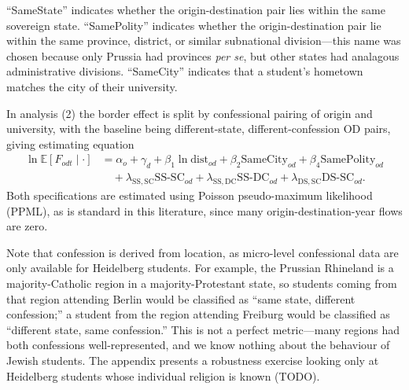 \documentclass[11pt]{article}
\begin{document}
``SameState'' indicates whether the origin-destination pair lies within the same sovereign state. ``SamePolity'' indicates whether the origin-destination pair lie within the same province, district, or similar subnational division---this name was chosen because only Prussia had provinces \emph{per se}, but other states had analagous administrative divisions. ``SameCity'' indicates that a student's hometown matches the city of their university.

In analysis (2) the border effect is split by confessional pairing of origin and university, with the baseline being different-state, different-confession OD pairs, giving estimating equation
\begin{equation}
\begin{split}
\ln \mathbb{E}\!\left[F_{odt} \mid \cdot\right]
  &= \alpha_o + \gamma_d + \beta_1 \ln \mathrm{dist}_{od}
   + \beta_2 \mathrm{SameCity}_{od}
   + \beta_4 \mathrm{SamePolity}_{od} \\
  &\quad + \lambda_{\mathrm{SS,SC}} \mathrm{SS\text{-}SC}_{od}
   + \lambda_{\mathrm{SS,DC}} \mathrm{SS\text{-}DC}_{od}
   + \lambda_{\mathrm{DS,SC}} \mathrm{DS\text{-}SC}_{od}.
\end{split}
\label{eq:gravity_confession}
\end{equation}
Both specifications are estimated using Poisson pseudo-maximum likelihood (PPML), as is standard in this literature, since many origin-destination-year flows are zero.

Note that confession is derived from location, as micro-level confessional data are only available for Heidelberg students. For example, the Prussian Rhineland is a majority-Catholic region in a majority-Protestant state, so students coming from that region attending Berlin would be classified as ``same state, different confession;'' a student from the region attending Freiburg would be classified as ``different state, same confession.'' This is not a perfect metric---many regions had both confessions well-represented, and we know nothing about the behaviour of Jewish students. The appendix presents a robustness exercise looking only at Heidelberg students whose individual religion is known (TODO).
\end{document}
